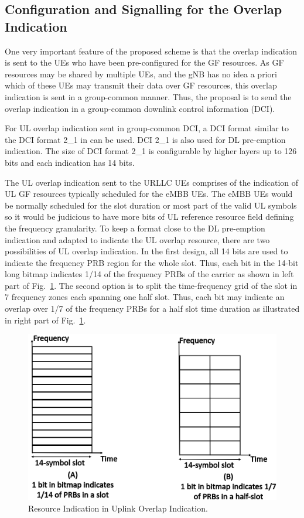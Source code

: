 \documentclass[conference]{IEEEtran}
\begin{document}
\subsection{Configuration and Signalling for the Overlap Indication}\label{IICC}
One very important feature of the proposed scheme is that the overlap indication is sent to the UEs who have been pre-configured for the GF resources. As GF resources may be shared by multiple UEs, and the gNB has no idea a priori which of these UEs may transmit their data over GF resources, this overlap indication is sent in a group-common manner. Thus, the proposal is to send the overlap indication in a group-common downlink control information (DCI).

For UL overlap indication sent in group-common DCI, a DCI format similar to the DCI format 2\_1 in \cite{ad6} can be used. DCI 2\_1 is also used for DL pre-emption indication. The size of DCI format 2\_1 is configurable by higher layers up to 126 bits and each indication has 14 bits. 

The UL overlap indication sent to the URLLC UEs comprises of the indication of UL GF resources typically scheduled for the eMBB UEs. The eMBB UEs would be normally scheduled for the slot duration or most part of the valid UL symbols so it would be judicious to have more bits of UL reference resource field defining the frequency granularity. To keep a format close to the DL pre-emption indication and adapted to indicate the UL overlap resource, there are two possibilities of UL overlap indication. In the first design, all 14 bits are used to indicate the frequency PRB region for the whole slot. Thus, each bit in the 14-bit long bitmap indicates 1/14 of the frequency PRBs of the carrier as shown in left part of Fig.~\ref{fig3}. The second option is to split the time-frequency grid of the slot in 7 frequency zones each spanning one half slot. Thus, each bit may indicate an overlap over 1/7 of the frequency PRBs for a half slot time duration as illustrated in right part of Fig.~\ref{fig3}. 

\begin{figure}[htbp]
\centerline{\includegraphics[scale=0.18]{fig3.png}}
\caption{Resource Indication in Uplink Overlap Indication.}
\label{fig3}
\vspace{-2mm}
\end{figure}
\end{document}
